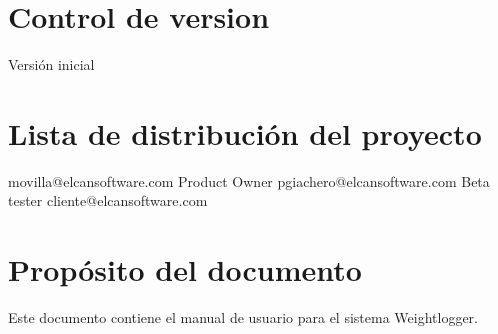 \section{Control de version}
\begin{elcanversions}
	 {Versión inicial}
\end{elcanversions}

\section{Lista de distribución del proyecto}

\begin{elcandistribution}
	 {movilla@elcansoftware.com} {\distribdate} 
	 {Product Owner} {pgiachero@elcansoftware.com} {\distribdate}
	 {Beta tester} {cliente@elcansoftware.com}{\distribdate}
\end{elcandistribution}

\section{Propósito del documento}
Este documento contiene el manual de usuario para el sistema Weightlogger.
